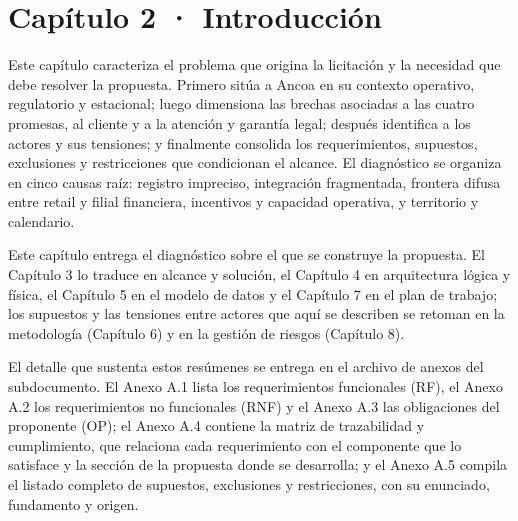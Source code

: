 \documentclass[11pt]{article}
\begin{document}
\renewcommand{\tablename}{Tabla}
\renewcommand{\figurename}{Figura}
\renewcommand{\thetable}{\arabic{table}}
\renewcommand{\thefigure}{\arabic{figure}}

\hypersetup{pageanchor=false}
\hypersetup{pageanchor=true}
\tableofcontents
\clearpage
\renewcommand{\listfigurename}{Lista de figuras}
\listoffigures
\clearpage
\renewcommand{\listtablename}{Lista de tablas}
\listoftables
\clearpage

\section{Capítulo 2 · Introducción}\label{capitulo-2-introduccion}

Este capítulo caracteriza el problema que origina la licitación y la necesidad que debe resolver la propuesta. Primero sitúa a Ancoa en su contexto operativo, regulatorio y estacional; luego dimensiona las brechas asociadas a las cuatro promesas, al cliente y a la atención y garantía legal; después identifica a los actores y sus tensiones; y finalmente consolida los requerimientos, supuestos, exclusiones y restricciones que condicionan el alcance. El diagnóstico se organiza en cinco causas raíz: registro impreciso, integración fragmentada, frontera difusa entre retail y filial financiera, incentivos y capacidad operativa, y territorio y calendario.

Este capítulo entrega el diagnóstico sobre el que se construye la propuesta. El Capítulo 3 lo traduce en alcance y solución, el Capítulo 4 en arquitectura lógica y física, el Capítulo 5 en el modelo de datos y el Capítulo 7 en el plan de trabajo; los supuestos y las tensiones entre actores que aquí se describen se retoman en la metodología (Capítulo 6) y en la gestión de riesgos (Capítulo 8).

El detalle que sustenta estos resúmenes se entrega en el archivo de anexos del subdocumento. El Anexo A.1 lista los requerimientos funcionales (RF), el Anexo A.2 los requerimientos no funcionales (RNF) y el Anexo A.3 las obligaciones del proponente (OP); el Anexo A.4 contiene la matriz de trazabilidad y cumplimiento, que relaciona cada requerimiento con el componente que lo satisface y la sección de la propuesta donde se desarrolla; y el Anexo A.5 compila el listado completo de supuestos, exclusiones y restricciones, con su enunciado, fundamento y origen.
\end{document}

